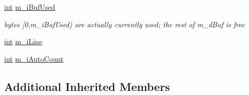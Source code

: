 \begin{DoxyCompactItemize}
\hyperlink{sphinxexpr_8cpp_a4a26e8f9cb8b736e0c4cbf4d16de985e}{int} \hyperlink{classCSphSource__BaseSV_a81e9ebdee306c5d0d3f654c90f05c44d}{m\-\_\-i\-Buf\-Used}
\begin{DoxyCompactList}\small\item\em bytes \mbox{[}0,m\-\_\-i\-Buf\-Used) are actually currently used; the rest of m\-\_\-d\-Buf is free \end{DoxyCompactList}\item 
\hyperlink{sphinxexpr_8cpp_a4a26e8f9cb8b736e0c4cbf4d16de985e}{int} \hyperlink{classCSphSource__BaseSV_a076423aa982d0c6d7917a588b8b3817d}{m\-\_\-i\-Line}
\item 
\hyperlink{sphinxexpr_8cpp_a4a26e8f9cb8b736e0c4cbf4d16de985e}{int} \hyperlink{classCSphSource__BaseSV_a2f8d1af1cc5e072a72a6bfe3aa5d3f0a}{m\-\_\-i\-Auto\-Count}
\end{DoxyCompactItemize}
\subsection*{Additional Inherited Members}


